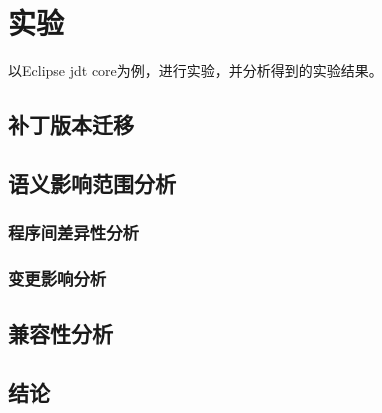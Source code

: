 \chapter{实验}
以Eclipse jdt core为例，进行实验，并分析得到的实验结果。
\section{补丁版本迁移}
\section{语义影响范围分析}
\subsection{程序间差异性分析}
\subsection{变更影响分析}
\section{兼容性分析}
\section{结论}
